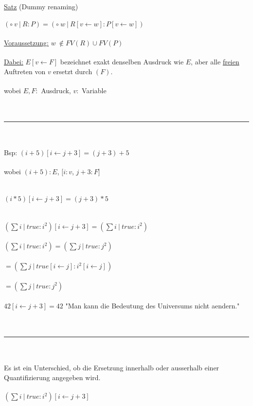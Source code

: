 \documentclass[18pt,a4paper]{article}
\begin{document}
\uline{Satz} (Dummy renaming)\\
\\
$(\circ \:v \:\vert\: R : P ) = (\circ \:w \:\vert\: R[v\leftarrow w] : P[v\leftarrow w] )$\\
\\
\uline{Voraussetzung:} $w \:\notin FV(R)\cup FV(P)$\\
\\
\uline{Dabei:} $E[v\leftarrow F]$ bezeichnet exakt denselben Ausdruck wie $E$, aber alle \uline{freien} Auftreten von $v$ ersetzt durch $(F)$.\\
\\
wobei $E, F:$ Ausdruck, $v:$ Variable\\
\\
\\
\rule{\textwidth}{0.4mm}\\
\\
Bsp: $(i+5)[i\leftarrow j+3] = (j+3)+5$\\
\\
wobei $(i+5): E$, $[i: v$, $j+3: F]$\\
\\
\\
$(i*5)[i\leftarrow j+3] = (j+3)*5$\\
\\
\\
$(\sum{i} \:\vert\: true : i^2)[i\leftarrow j+3] = (\sum{i} \:\vert\: true : i^2)$\\
\\
$(\sum{i} \:\vert\: true : i^2) = (\sum{j} \:\vert\: true : j^2)$\\
\\
$= (\sum{j} \:\vert\: true[i\leftarrow j] : i^2[i\leftarrow j])$\\
\\
$= (\sum{j} \:\vert\: true : j^2)$\\
\\
$42[i\leftarrow j+3] = 42$ "Man kann die Bedeutung des Universums nicht aendern."\\
\\
\\
\rule{\textwidth}{0.4mm}\\
\\
Es ist ein Unterschied, ob die Ersetzung innerhalb oder ausserhalb einer Quantifizierung angegeben wird.\\
\\
$(\sum{i} \:\vert\: true : i^2)[i \leftarrow j + 3]$\\
\\
\end{document}

